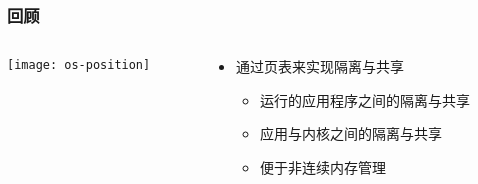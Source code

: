 \begin{frame}   
	\frametitle{回顾}
	
	\begin{columns}
		
		\begin{column}{.5\textwidth}
			
			\texttt{[image: os-position]}
			
		\end{column}
		
		
		\begin{column}{.5\textwidth}
			
			\begin{itemize}\large
				\item 通过页表来实现隔离与共享
				\begin{itemize}
					\item 运行的应用程序之间的隔离与共享
					\item 应用与内核之间的隔离与共享
					\item 便于非连续内存管理								
				\end{itemize}
			\end{itemize}
			
		\end{column}
		
		
	\end{columns}
	
\end{frame}


